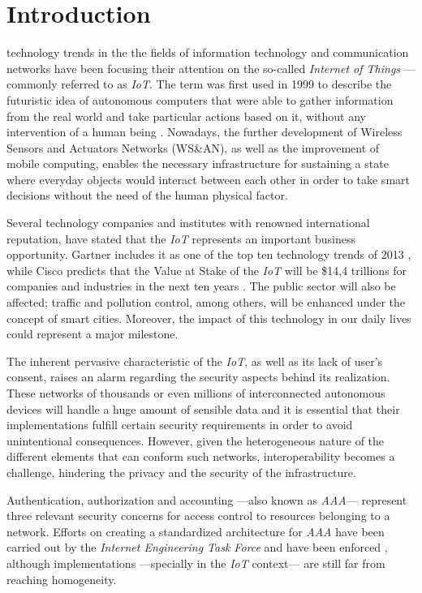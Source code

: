 \documentclass[journal]{IEEEtran}
\begin{document}
\section{Introduction}
   technology trends in the the fields of information technology and communication networks have been focusing their attention on the so-called \emph{Internet of Things} ---commonly referred to as \emph{IoT}. The term was first used in 1999 to describe the futuristic idea of autonomous computers that were able to gather information from the real world and take particular actions based on it, without any intervention of a human being \cite{Ashton2009}. Nowadays, the further development of Wireless Sensors and Actuators Networks (WS\&AN), as well as the improvement of mobile computing, enables the necessary infrastructure for sustaining a state where everyday objects would interact between each other in order to take smart decisions without the need of the human physical factor.

  Several technology companies and institutes with renowned international reputation, have stated that the \emph{IoT} represents an important business opportunity. Gartner includes it as one of the top ten technology trends of 2013 \cite{Gartner2012}, while Cisco predicts that the Value at Stake of the \emph{IoT} will be \$14,4 trillions for companies and industries in the next ten years \cite{JosephBradley2013}. The public sector will also be affected; traffic and pollution control, among others, will be enhanced under the concept of smart cities. Moreover, the impact of this technology in our daily lives could represent a major milestone.

  The inherent pervasive characteristic of the \emph{IoT}, as well as its lack of user's consent, raises an alarm regarding the security aspects behind its realization. These networks of thousands or even millions of interconnected autonomous devices will handle a huge amount of sensible data and it is essential that their implementations fulfill certain security requirements in order to avoid unintentional consequences. However, given the heterogeneous nature of the different elements that can conform such networks, interoperability becomes a challenge, hindering the privacy and the security of the infrastructure.

  Authentication, authorization and accounting ---also known as \emph{AAA}--- represent three relevant security concerns for access control to resources belonging to a network. Efforts on creating a standardized architecture for \emph{AAA} have been carried out by the \emph{Internet Engineering Task Force} and have been enforced \cite{RFC2903}, \cite{RFC2904} although implementations ---specially in the \emph{IoT} context--- are still far from reaching homogeneity.
   
\end{document}
